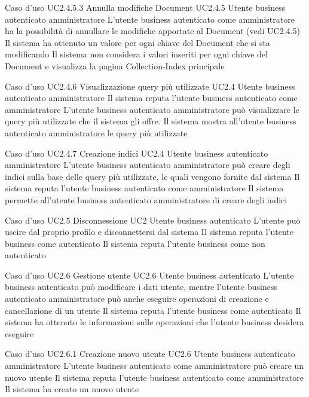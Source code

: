 \UCtitle
{Caso d'uso UC2.4.5.3}
{Annulla modifiche Document}
\UC
{UC2.4.5}
{Utente business autenticato amministratore}
{L'utente business autenticato come amministratore ha la possibilità di annullare le modifiche apportate al Document (vedi UC2.4.5)}
{Il sistema ha ottenuto un valore per ogni chiave del Document che si sta modificando}
\post
{Il sistema non considera i valori inseriti per ogni chiave del Document e visualizza la pagina Collection-Index principale}

\UCtitle
{Caso d'uso UC2.4.6}
{Visualizzazione query più utilizzate}
\UC
{UC2.4}
{Utente business autenticato amministratore}
{Il sistema reputa l'utente business autenticato come amministratore}
{L'utente business autenticato amministratore può visualizzare le query più utilizzate che il sistema gli offre.}
\post
{Il sistema mostra all'utente business autenticato amministratore le query più utilizzate}

\UCtitle
{Caso d'uso UC2.4.7}
{Creazione indici}
\UC
{UC2.4}
{Utente business autenticato amministratore}
{L'utente business autenticato amministratore può creare degli indici sulla base delle query più utilizzate, le quali vengono fornite dal sistema}
{Il sistema reputa l'utente business autenticato come amministratore}
\post
{Il sistema permette all'utente business autenticato amministratore di creare degli indici}

\UCtitle
{Caso d'uso UC2.5}
{Disconnessione}
\UC
{UC2}
{Utente business autenticato}
{L'utente può uscire dal proprio profilo e disconnettersi dal sistema}
{Il sistema reputa l'utente business come autenticato}
\post
{Il sistema reputa l'utente business come non autenticato}

\UCtitle
{Caso d'uso UC2.6}
{Gestione utente}
\UC
{UC2.6}
{Utente business autenticato}
{L'utente business autenticato può modificare i dati utente, mentre l'utente business autenticato amministratore può anche eseguire operazioni di creazione e cancellazione di un utente}
{Il sistema reputa l'utente business come autenticato}
\post
{Il sistema ha ottenuto le informazioni sulle operazioni che l'utente business desidera eseguire}

\UCtitle
{Caso d'uso UC2.6.1}
{Creazione nuovo utente}
\UC
{UC2.6}
{Utente business autenticato amministratore}
{L'utente business autenticato come amministratore può creare un nuovo utente}
{Il sistema reputa l'utente business autenticato come amministratore}
\post
{Il sistema ha creato un nuovo utente}



